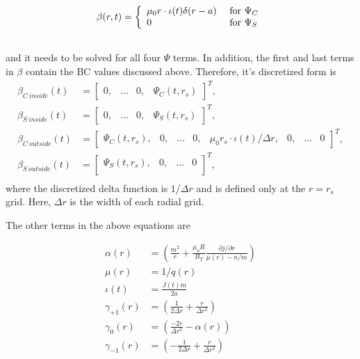 \documentclass{article}
\begin{document}
\begin{equation} \label{eq:beta}
\begin{split}
\beta(r,t) &= \left\{
\begin{array}{l l}
\mu_0r \cdot \iota(t) \delta (r-a) & \text{ for } \Psi_C \\
0 & \text{ for } \Psi_S\\
\end{array} \right. \\\
\end{split}
\end{equation} 
and it needs to be solved for all four $\Psi$ terms.  In addition, the first and last terms in $\beta$ contain the BC values discussed above.  Therefore, it's discretized form is
\begin{equation} \label{eq:BVPAMatrix}
\begin{split}
\beta_{C \ inside}(t) &= 
\begin{bmatrix}
0,& \ldots &  0, & \Psi_{C}(t,r_s)
\end{bmatrix}^T, \\
\beta_{S \ inside}(t) &= 
\begin{bmatrix}
0,& \ldots &  0, & \Psi_{S}(t,r_s)
\end{bmatrix}^T, \\
\beta_{C \ outside}(t) &= 
\begin{bmatrix}
\Psi_{C}(t,r_s), & 0, & \ldots &0, &\mu_0r_s \cdot \iota(t)/\Delta r,  &0,&\ldots &  0 
\end{bmatrix}^T, \\
\beta_{S \ outside}(t) &= 
\begin{bmatrix}
\Psi_{S}(t,r_s), & 0, & \ldots &  0 \\
\end{bmatrix}^T, \\
\end{split}
\end{equation}
where the discretized delta function is $1/ \Delta r$ and is defined only at the $r=r_s$ grid.  Here, $\Delta r$ is the width of each radial grid.


The other terms in the above equations are

\begin{equation} \label{eq:BVPTerms}
\begin{split}
\alpha(r)&=\left( \frac{m^2}{r} +\frac{\mu_0 R}{B_T} \frac{\partial j / \partial r}{\mu(r)-n/m} \right) \\
\mu(r)&=1/q(r)\\
\iota(t) &= \frac{J(t)m}{2a} \\
  \gamma_{+1}(r) &=\left(\frac{1}{2 \Delta r}+\frac{r}{\Delta r^2 }\right) \\
  \gamma_{0}(r)& = \left( \frac{-2r}{\Delta r^2} -\alpha(r) \right)\\
  \gamma_{-1}(r)& = \left(-\frac{1}{2\Delta r} + \frac{r}{\Delta r^2} \right)
\end{split}
\end{equation}
\end{document}
